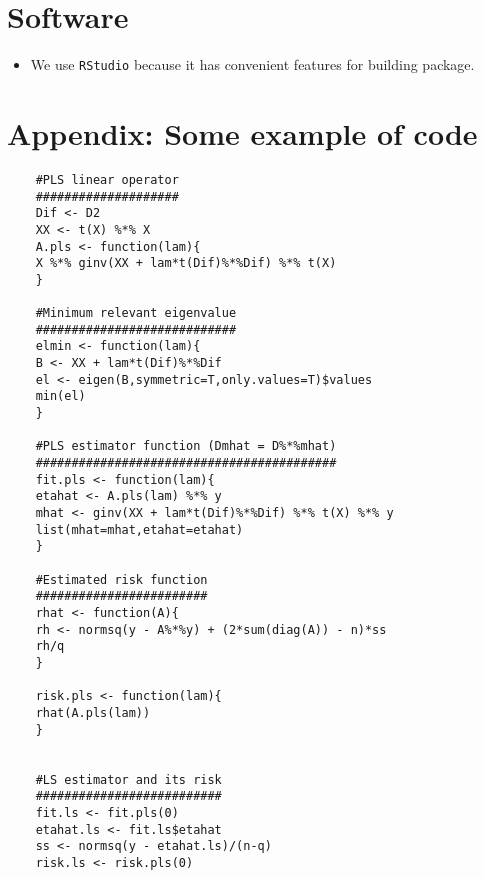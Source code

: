 \documentclass[draft]{article}
\begin{document}


\section{Software}
\begin{itemize}
	\item We use \texttt{RStudio} because it has convenient features for building package.
\end{itemize}






\section{Appendix: Some example of code}
	\begin{verbatim}
	#PLS linear operator
	####################
	Dif <- D2
	XX <- t(X) %*% X
	A.pls <- function(lam){
	X %*% ginv(XX + lam*t(Dif)%*%Dif) %*% t(X)    
	}
	
	#Minimum relevant eigenvalue
	############################
	elmin <- function(lam){
	B <- XX + lam*t(Dif)%*%Dif
	el <- eigen(B,symmetric=T,only.values=T)$values
	min(el)        
	}
	
	#PLS estimator function (Dmhat = D%*%mhat)
	##########################################
	fit.pls <- function(lam){
	etahat <- A.pls(lam) %*% y
	mhat <- ginv(XX + lam*t(Dif)%*%Dif) %*% t(X) %*% y       
	list(mhat=mhat,etahat=etahat)   
	}
	
	#Estimated risk function
	########################
	rhat <- function(A){
	rh <- normsq(y - A%*%y) + (2*sum(diag(A)) - n)*ss
	rh/q
	}
	
	risk.pls <- function(lam){
	rhat(A.pls(lam))   
	} 
	
	
	#LS estimator and its risk
	##########################
	fit.ls <- fit.pls(0)
	etahat.ls <- fit.ls$etahat 
	ss <- normsq(y - etahat.ls)/(n-q)
	risk.ls <- risk.pls(0)
	
	\end{verbatim}
 
 
 
 
\end{document}
